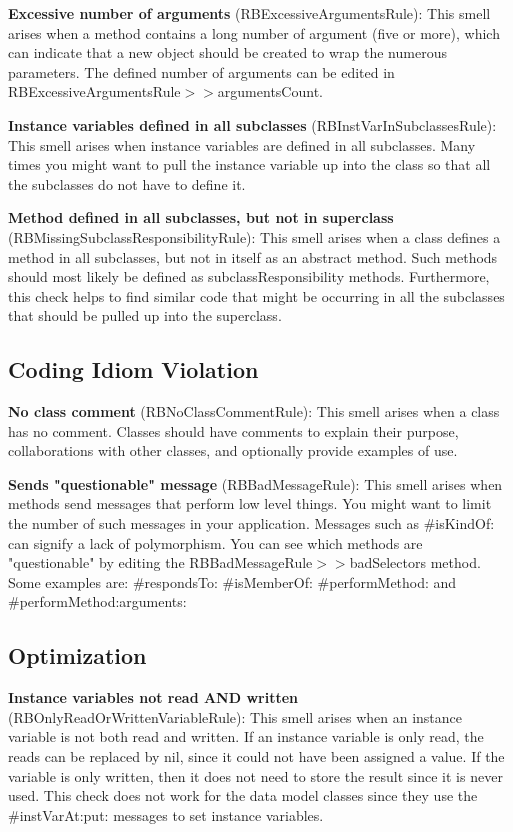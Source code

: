 \documentclass[a4paper,10pt,twoside]{book}
\begin{document}
\textbf{Excessive number of arguments} (RBExcessiveArgumentsRule): This smell arises when a method contains a long number of argument (five or more), which can indicate that a new object should be created to wrap the numerous parameters. The defined number of arguments can be edited in RBExcessiveArgumentsRule$>>$argumentsCount.

\textbf{Instance variables defined in all subclasses} (RBInstVarInSubclassesRule): This smell arises when instance variables are defined in all subclasses. Many times you might want to pull the instance variable up into the class so that all the subclasses do not have to define it.

\textbf{Method defined in all subclasses, but not in superclass} (RBMissingSubclassResponsibilityRule): This smell arises when a class defines a method in all subclasses, but not in itself as an abstract method. Such methods should most likely be defined as subclassResponsibility methods. Furthermore, this check helps to find similar code that might be occurring in all the subclasses that should be pulled up into the superclass.

\subsection{Coding Idiom Violation}
\textbf{No class comment} (RBNoClassCommentRule): This smell arises when a class has no comment. Classes should have comments to explain their purpose, collaborations with other classes, and optionally provide examples of use.

\textbf{Sends "questionable" message} (RBBadMessageRule): This smell arises when methods send messages that perform low level things. You might want to limit the number of such messages in your application. Messages such as \#isKindOf: can signify a lack of polymorphism. You can see which methods are "questionable" by editing the RBBadMessageRule$>>$badSelectors method. Some examples are: \#respondsTo: \#isMemberOf: \#performMethod: and \#performMethod:arguments:

\subsection{Optimization}
\textbf{Instance variables not read AND written} (RBOnlyReadOrWrittenVariableRule): This smell arises when an instance variable is not both read and written. If an instance variable is only read, the reads can be replaced by nil, since it could not have been assigned a value. If the variable is only written, then it does not need to store the result since it is never used. This check does not work for the data model classes since they use the \#instVarAt:put: messages to set instance variables.
\end{document}
